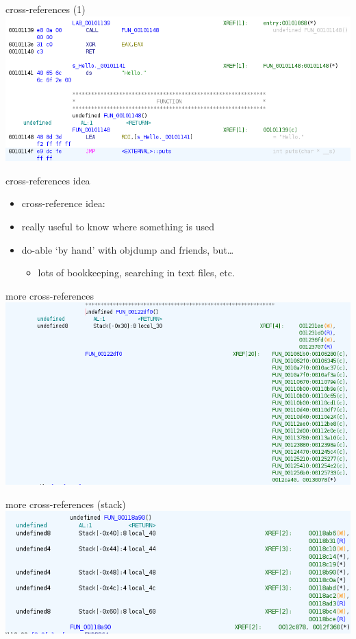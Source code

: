 \begin{frame}{cross-references (1)}
\includegraphics[width=\textwidth]{../re-tools/ghidra-disass-mixed-w-xref}
\end{frame}

\begin{frame}{cross-references idea}
    \begin{itemize}
    \item cross-reference idea:
    \item really useful to know where something is used
    \vspace{.5cm}
    \item do-able `by hand' with objdump and friends, but\ldots
        \begin{itemize}
        \item lots of bookkeeping, searching in text files, etc.
        \end{itemize}
    \end{itemize}
\end{frame}

\begin{frame}{more cross-references}
\includegraphics[width=\textwidth]{../re-tools/ghidra-mystery-xref-many}
\end{frame}

\begin{frame}{more cross-references (stack)}
\includegraphics[width=\textwidth]{../re-tools/xrefs-func}
\end{frame}

